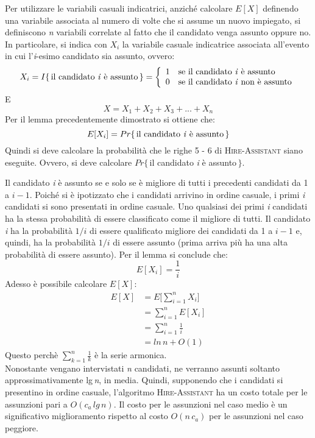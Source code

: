 \documentclass[10pt, a4paper]{report}
\begin{document}
Per utilizzare le variabili casuali indicatrici, anziché calcolare $E[X]$ definendo una variabile associata al numero di volte che si assume un nuovo impiegato, si definiscono \textit{n} variabili correlate al fatto che il candidato venga assunto oppure no. In particolare, si indica con $X_i$ la variabile casuale indicatrice associata all'evento in cui l'\textit{i}-esimo candidato sia assunto, ovvero:
\begin{equation*}
X_i = I\{\,\text{il candidato \textit{i} è assunto}\,\} = \left\{
\begin{array}{ll}
1 & \text{se il candidato \textit{i} è assunto} \\
0 & \text{se il candidato \textit{i} non è assunto}
\end{array}\right.
\end{equation*}
E
\begin{equation*}
X = X_1 + X_2 + X_3 + ... + X_n
\end{equation*}
Per il lemma precedentemente dimostrato si ottiene che:
\begin{equation*}
E[X_i] = Pr\{\,\text{il candidato \textit{i} è assunto}\,\}
\end{equation*}
Quindi si deve calcolare la probabilità che le righe 5 - 6 di \textsc{Hire-Assistant} siano eseguite. Ovvero, si deve calcolare $Pr\{$\,il candidato \textit{i} è assunto\,$\}$.

Il candidato \textit{i} è assunto se e solo se è migliore di tutti i precedenti candidati da 1 a $i - 1$. Poiché si è ipotizzato che i candidati arrivino in ordine casuale, i primi \textit{i} candidati si sono presentati in ordine casuale. Uno qualsiasi dei primi \textit{i} candidati ha la stessa probabilità di essere classificato come il migliore di tutti. Il candidato \textit{i} ha la probabilità $1/i$ di essere qualificato migliore dei candidati da 1 a $i - 1$ e, quindi, ha la probabilità $1/i$ di essere assunto (prima arriva più ha una alta probabilità di essere assunto). Per il lemma si conclude che:
\begin{equation*}
E[X_i] = \frac{1}{i}
\end{equation*}
Adesso è possibile calcolare $E[X]$:
\begin{align*}
E[X] &= E\Biggl[\sum_{i=1}^{n}X_i\Biggr] \\
&= \sum_{i=1}^{n}E[X_i] \\
&= \sum_{i=1}^{n}\frac{1}{i} \\
&= ln\,n + O(1)
\end{align*}
Questo perchè $\sum_{k=1}^{n}\frac{1}{k}$ è la serie armonica.\\Nonostante vengano intervistati \textit{n} candidati, ne verranno assunti soltanto approssimativamente lg\,\textit{n}, in media. Quindi, supponendo che i candidati si presentino in ordine casuale, l'algoritmo \textsc{Hire-Assistant} ha un costo totale per le assunzioni pari a $O(c_a\,lg\,n)$. Il costo per le assunzioni nel caso medio è un significativo miglioramento rispetto al costo $O(n\,c_a)$ per le assunzioni nel caso peggiore.
\end{document}
